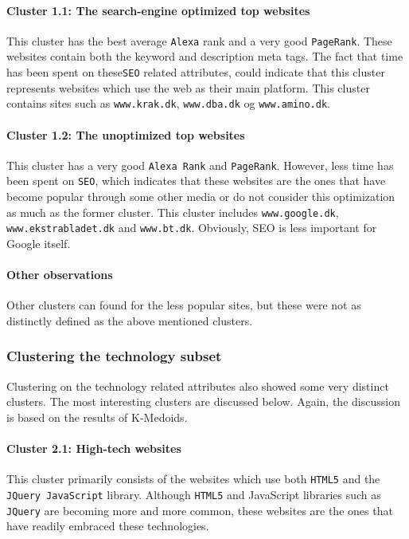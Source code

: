 \paragraph{Cluster 1.1: The search-engine optimized top websites}

This cluster has the best average \texttt{Alexa} rank and a very good \texttt{PageRank}. These websites contain both the keyword and description meta tags. The fact that time has been spent on these\texttt{SEO} related attributes, could indicate that this cluster represents websites which use the web as their main platform. This cluster contains sites such as \verb|www.krak.dk|, \verb|www.dba.dk| og \verb|www.amino.dk|.

\paragraph{Cluster 1.2: The unoptimized top websites}

This cluster has a very good \texttt{Alexa Rank} and \texttt{PageRank}. However, less time has been spent on \texttt{SEO}, which indicates that these websites are the ones that have become popular through some other media or do not consider this optimization as much as the former cluster. This cluster includes \verb|www.google.dk|, \verb|www.ekstrabladet.dk| and \verb|www.bt.dk|. Obviously, SEO is less important for Google itself.

\paragraph{Other observations} Other clusters can found for the less popular sites, but these were not as distinctly defined as the above mentioned clusters.

\subsubsection{Clustering the technology subset}

Clustering on the technology related attributes also showed some very distinct clusters. The most interesting clusters are discussed below. Again, the discussion is based on the results of K-Medoids.

\paragraph{Cluster 2.1: High-tech websites}

This cluster primarily consists of the websites which use both \texttt{HTML5} and the \texttt{JQuery JavaScript} library. Although \texttt{HTML5} and JavaScript libraries such as \texttt{JQuery} are becoming more and more common, these websites are the ones that have readily embraced these technologies.

